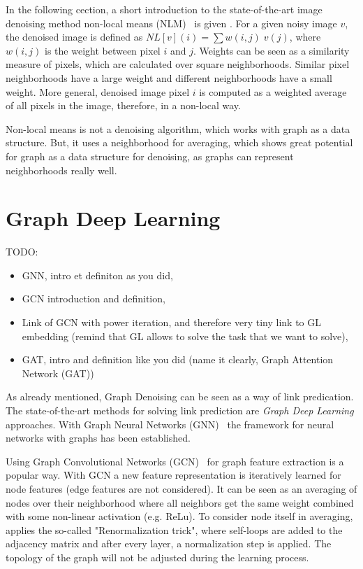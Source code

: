 In the following cection, a short introduction to the 
state-of-the-art image denoising method non-local means (NLM)~\cite{noneLocalMean} is given .
For a given noisy image $v$, the denoised image is defined as $NL[v](i) = \sum{w(i,j) \; v(j)}$,
where $w(i,j)$ is the weight between pixel $i$ and $j$. 
Weights can be seen as a similarity measure of pixels, which are calculated over square neighborhoods.
Similar pixel neighborhoods have a large weight and different neighborhoods have a small weight.
More general, denoised image pixel $i$ is computed as a weighted average of all pixels in the 
image, therefore, in a non-local way.

Non-local means is not a denoising algorithm, which works with graph as a data structure.
But, it uses a neighborhood for averaging, which shows great potential for graph
as a data structure for denoising, as graphs can represent neighborhoods really well.


\section{Graph Deep Learning}
TODO:
\begin{itemize}
    \item GNN, intro et definiton as you did, 
    \item GCN introduction and definition,
    \item Link of GCN with power iteration, and therefore very tiny link to GL embedding 
    (remind that GL allows to solve the task that we want to solve), 
    \item GAT, intro and definition like you did (name it clearly, Graph Attention Network (GAT))
\end{itemize}

\label{sec:graph_depp_learning}
As already mentioned, Graph Denoising can be seen as a way of link predication. 
The state-of-the-art methods for solving link prediction are \textit{Graph Deep Learning} approaches.
With Graph Neural Networks (GNN)~\cite{GNN} the framework
for neural networks with graphs has been established. 

Using Graph Convolutional Networks (GCN)~\cite{GCN} for graph feature extraction is a popular way. 
With GCN a new feature representation is iteratively learned for node features (edge features are not considered).
It can be seen as an averaging of nodes over their neighborhood where all neighbors get the same weight combined with some non-linear activation (e.g. ReLu). 
To consider node itself in averaging, \citet{GCN} applies the so-called "Renormalization trick", where self-loops are added to the 
adjacency matrix and after every layer, a normalization step is applied. 
The topology of the graph will not be adjusted during the learning process.

